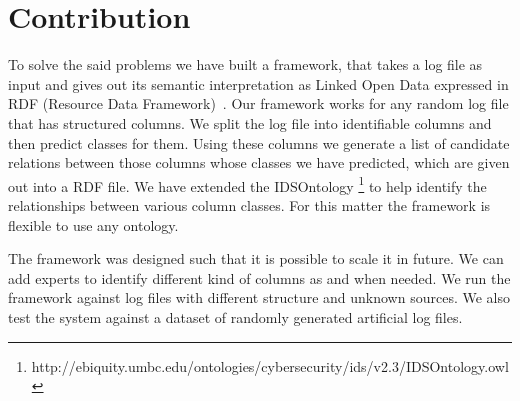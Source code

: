 \section{Contribution}

To solve the said problems we have built a framework, that takes a log file as input and gives out its semantic interpretation as Linked Open Data expressed in RDF (Resource Data Framework)~\cite{brickley2004rdf}. Our framework works for any random log file that has structured columns. We split the log file into identifiable columns and then predict classes for them. Using these columns we generate a list of candidate relations between those columns whose classes we have predicted, which are given out into a RDF file. We have extended the IDSOntology \footnote{http://ebiquity.umbc.edu/ontologies/cybersecurity/ids/v2.3/IDSOntology.owl} to help identify the relationships between various column classes. For this matter the framework is flexible to use any ontology.

The framework was designed such that it is possible to scale it in future. We can add experts to identify different kind of columns as and when needed. We run the framework against log files with different structure and unknown sources. We also test the system against a dataset of randomly generated artificial log files.
